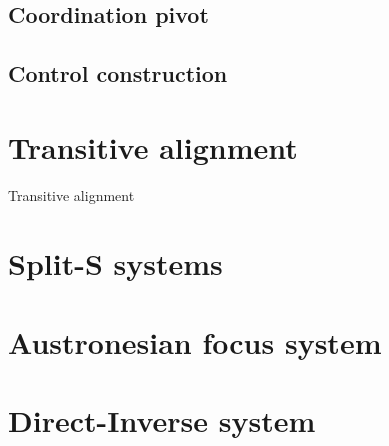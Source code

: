 \documentclass{article}
\begin{document}
\subsection{Coordination pivot}

\subsection{Control construction}



\section{Transitive alignment}


Transitive alignment

\section{Split-S systems}

\section{Austronesian focus system}

\section{Direct-Inverse system}



\end{document}
